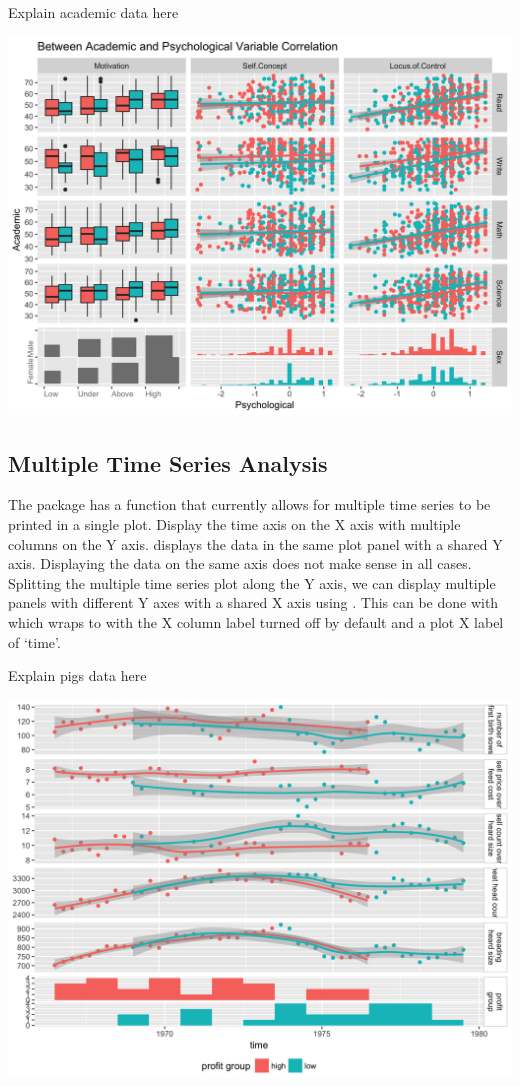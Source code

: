 \documentclass[article]{jss}
\begin{document}
  Explain academic data here

  \includegraphics{imgs/cca.png}



  \subsection{Multiple Time Series Analysis}

  The  package has a  function that currently allows for multiple time series to be printed in a single plot.
  Display the time axis on the X axis with multiple columns on the Y axis.
   displays the data in the same plot panel with a shared Y axis.
  Displaying the data on the same axis does not make sense in all cases.
  Splitting the multiple time series plot along the Y axis, we can display multiple panels with different Y axes with a shared X axis using .
  This can be done with  which wraps to  with the X column label turned off by default and a plot X label of `time'.

  Explain pigs data here

  \includegraphics{imgs/pigs.png}
\end{document}
